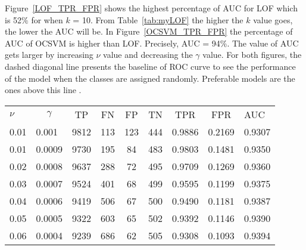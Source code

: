Figure~\ref{LOF_TPR_FPR} shows the highest percentage of AUC for LOF which is 52$\%$ for when $k$ = 10. From Table~\ref{tab:myLOF} the higher the $k$ value goes, the lower the AUC will be. In Figure~\ref{OCSVM_TPR_FPR} the percentage of AUC of OCSVM is higher than LOF. Precisely, AUC = 94$\%$. The value of AUC gets larger by increasing $\nu$ value and decreasing the $\gamma$ value. For both figures, the dashed diagonal line presents the baseline of ROC curve to see the performance of the model when the classes are assigned randomly. Preferable models are the ones above this line \citep{AUROC}.

\vspace{1em}
\begin{table}[H]
\centering
\begin{tabular}{|l|l|c|c|c|c|c|c|l|}
\hline
\rowcolor[HTML]{9B9B9B} 
\multicolumn{9}{|c|}{\cellcolor[HTML]{9B9B9B}\textbf{OCSVM}}                                                                                                         \\ \hline
\rowcolor[HTML]{C0C0C0} 
$\nu$ & \multicolumn{1}{c|}{\cellcolor[HTML]{C0C0C0}$\gamma$} & TP & FN & FP & TN & TPR & FPR & AUC \\ \hline
0.01  & 0.001                                                 & 9812        & 113         & 123         & 444         & 0.9886       & 0.2169       & 0.9307       \\ \hline
0.01  & 0.0009                                                & 9730        & 195         & 84          & 483         & 0.9803       & 0.1481       & 0.9350       \\ \hline
0.02  & 0.0008                                                & 9637        & 288         & 72          & 495         & 0.9709       & 0.1269       & 0.9360       \\ \hline
0.03  & 0.0007                                                & 9524        & 401         & 68          & 499         & 0.9595       & 0.1199       & 0.9375       \\ \hline
0.04  & 0.0006                                                & 9419        & 506         & 67          & 500         & 0.9490       & 0.1181       & 0.9387       \\ \hline
0.05  & 0.0005                                                & 9322        & 603         & 65          & 502         & 0.9392       & 0.1146       & 0.9390       \\ \hline
0.06  & 0.0004                                                & 9239        & 686         & 62          & 505         & 0.9308       & 0.1093       & 0.9394       \\ \hline

\end{tabular}
\end{table}
